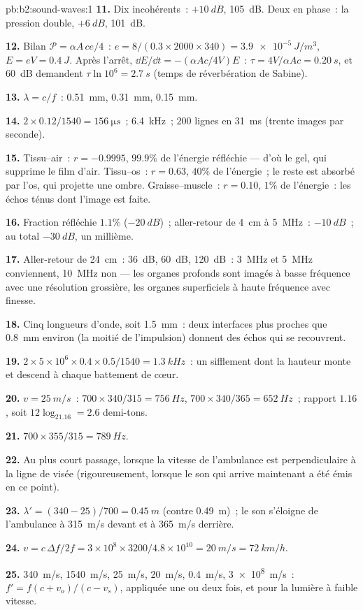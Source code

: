 \begin{solution}{pb:b2:sound-waves:1}
\textbf{11.} Dix incohérents~: $+\qty{10}{dB}$, \qty{105}{dB}. Deux en phase~: la
pression double, $+\qty{6}{dB}$, \qty{101}{dB}.

\textbf{12.} Bilan $\mathcal P = \alpha A\,ce/4$~: $e = 8/(0.3 \times 2000 \times 340) =
\qty{3.9e-5}{J/m^3}$, $E = eV = \qty{0.4}{J}$. Après l'arrêt, $\dd E/\dd t = -(\alpha Ac
/4V)E$~: $\tau = 4V/\alpha Ac = \qty{0.20}{s}$, et \qty{60}{dB} demandent $\tau\ln10^6 =
\qty{2.7}{s}$ (temps de réverbération de Sabine).

\textbf{13.} $\lambda = c/f$~: \qty{0.51}{mm}, \qty{0.31}{mm}, \qty{0.15}{mm}.

\textbf{14.} $2 \times 0.12/1540 = \qty{156}{\micro s}$~; \qty{6.4}{kHz}~; $200$ lignes en
\qty{31}{ms} (trente images par seconde).

\textbf{15.} Tissu--air~: $r = -0.9995$, $99.9\%$ de l'énergie réfléchie
--- d'où le gel, qui supprime le film d'air. Tissu--os~: $r = 0.63$,
$40\%$ de l'énergie~; le reste est absorbé par l'os, qui projette une
ombre. Graisse--muscle~: $r = 0.10$, $1\%$ de l'énergie~: les échos ténus dont
l'image est faite.

\textbf{16.} Fraction réfléchie $1.1\%$ ($-\qty{20}{dB}$)~; aller-retour de
\qty{4}{cm} à \qty{5}{MHz}~: $-\qty{10}{dB}$~; au total $-\qty{30}{dB}$, un millième.

\textbf{17.} Aller-retour de \qty{24}{cm}~: \qty{36}{dB}, \qty{60}{dB}, \qty{120}{dB}~: \qty{3}{MHz}
et \qty{5}{MHz} conviennent, \qty{10}{MHz} non --- les organes profonds sont imagés à
basse fréquence avec une résolution grossière, les organes superficiels à haute
fréquence avec finesse.

\textbf{18.} Cinq longueurs d'onde, soit \qty{1.5}{mm}~: deux interfaces plus proches
que \qty{0.8}{mm} environ (la moitié de l'impulsion) donnent des échos qui se recouvrent.

\textbf{19.} $2 \times 5 \times 10^6 \times 0.4 \times 0.5/1540 = \qty{1.3}{kHz}$~: un sifflement dont
la hauteur monte et descend à chaque battement de cœur.

\textbf{20.} $v = \qty{25}{m/s}$~: $700 \times 340/315 = \qty{756}{Hz}$, $700 \times 340/365 =
\qty{652}{Hz}$~; rapport $1.16$, soit $12\log_21.16 = 2.6$ demi-tons.

\textbf{21.} $700 \times 355/315 = \qty{789}{Hz}$.

\textbf{22.} Au plus court passage, lorsque la vitesse de l'ambulance est
perpendiculaire à la ligne de visée (rigoureusement, lorsque le son qui arrive
maintenant a été émis en ce point).

\textbf{23.} $\lambda' = (340 - 25)/700 = \qty{0.45}{m}$ (contre \qty{0.49}{m})~; le
son s'éloigne de l'ambulance à \qty{315}{m/s} devant et à \qty{365}{m/s}
derrière.

\textbf{24.} $v = c\,\Delta f/2f = 3 \times 10^8 \times 3200/4.8 \times 10^{10} = \qty{20}{m/s} =
\qty{72}{km/h}$.

\textbf{25.} \qty{340}{m/s}, \qty{1540}{m/s}, \qty{25}{m/s}, \qty{20}{m/s}, \qty{0.4}{m/s},
\qty{3e8}{m/s}~: $f' = f(c + v_o)/(c - v_s)$, appliquée une ou deux fois, et pour la
lumière à faible vitesse.
\end{solution}
